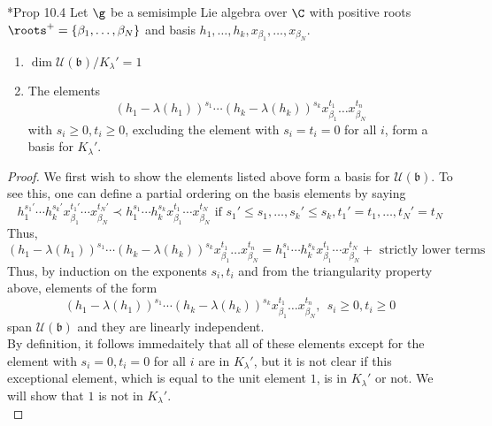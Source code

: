\documentclass[11pt,leqno,oneside]{amsart}
\numberwithin{thm}{section}
\newcommand{\U}{\mathcal{U}}
\renewcommand{\b}{\mathfrak{b}}
\begin{document}
\begin{prop} \cite{carter}*{Prop 10.4} Let \(\g\) be a semisimple Lie
  algebra over \(\C\) with positive roots \(\roots^+ = \{\beta_1,
  \ldots, \beta_N\}\) and basis \(h_1, \ldots, h_k, x_{\beta_1},
  \ldots, x_{\beta_N}\). 
  \begin{enumerate}
  \item \(\dim \U(\b)/K_\lambda' = 1\)
  \item The elements \[
      (h_1-\lambda(h_1))^{s_1} \cdots (h_k-\lambda(h_k))^{s_k}
      x_{\beta_1}^{t_1} \ldots x_{\beta_N}^{t_n}
    \]
    with \(s_i \geq 0, t_i \geq 0\), excluding the element with \(s_i
    = t_i = 0\) for all \(i\), form a basis for \(K_\lambda'\).
  \end{enumerate}
\end{prop}
\begin{proof}
  We first wish to show the elements listed above form a basis for
  \(\U(\b)\). To see this, one 
  can define a 
  partial ordering on the basis elements by saying \[
    h_1^{s_1'} \cdots h_k^{s_k'} x_{\beta_1}^{t_1'} \cdots
    x_{\beta_N}^{t_N'} \prec h_1^{s_1} \cdots h_k^{s_k} x_{\beta_1}^{t_1} \cdots
    x_{\beta_N}^{t_N} \text{ if } s_1' \leq s_1, \ldots, s_k' \leq
    s_k, t_1'=t_1, \ldots, t_N' = t_N
  \]
  Thus, \[
    (h_1-\lambda(h_1))^{s_1} \cdots (h_k-\lambda(h_k))^{s_k}
      x_{\beta_1}^{t_1} \ldots x_{\beta_N}^{t_n} = h_1^{s_1} \cdots h_k^{s_k} x_{\beta_1}^{t_1} \cdots
    x_{\beta_N}^{t_N} + \text{ strictly lower terms}
  \]
  Thus, by induction on the exponents \(s_i,t_i\) and from the
  triangularity property above, elements of the form \[
(h_1-\lambda(h_1))^{s_1} \cdots (h_k-\lambda(h_k))^{s_k}
      x_{\beta_1}^{t_1} \ldots x_{\beta_N}^{t_n}, \ \ s_i \geq 0, t_i
      \geq 0
    \]
    span \(\U(\b)\) and they are linearly independent. \\

    By definition, it follows immedaitely that all of these elements
    except for the element with 
    \(s_i = 0, t_i = 0\) for all \(i\) are in \(K_\lambda'\), but it
    is not clear if this exceptional element, which is equal to the
    unit element \(1\), is in \(K_\lambda'\) or not. We will show that
    \(1\) is not in \(K_\lambda'\). \\


\end{proof}
\end{document}
